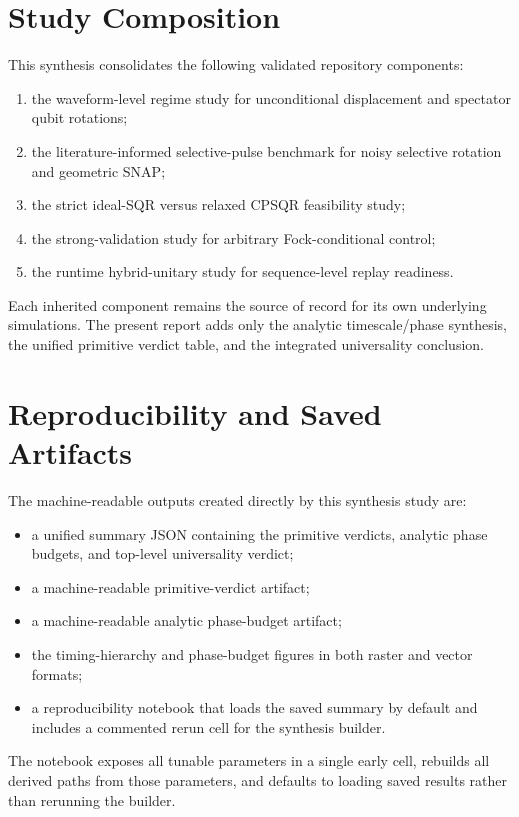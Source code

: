 \documentclass[11pt]{article}
\begin{document}
\appendix

\section{Study Composition}

This synthesis consolidates the following validated repository components:
\begin{enumerate}
\item the waveform-level regime study for unconditional displacement and spectator qubit rotations;
\item the literature-informed selective-pulse benchmark for noisy selective rotation and geometric SNAP;
\item the strict ideal-SQR versus relaxed CPSQR feasibility study;
\item the strong-validation study for arbitrary Fock-conditional control;
\item the runtime hybrid-unitary study for sequence-level replay readiness.
\end{enumerate}

Each inherited component remains the source of record for its own underlying simulations. The present report adds only the analytic timescale/phase synthesis, the unified primitive verdict table, and the integrated universality conclusion.

\section{Reproducibility and Saved Artifacts}

The machine-readable outputs created directly by this synthesis study are:
\begin{itemize}
\item a unified summary JSON containing the primitive verdicts, analytic phase budgets, and top-level universality verdict;
\item a machine-readable primitive-verdict artifact;
\item a machine-readable analytic phase-budget artifact;
\item the timing-hierarchy and phase-budget figures in both raster and vector formats;
\item a reproducibility notebook that loads the saved summary by default and includes a commented rerun cell for the synthesis builder.
\end{itemize}

The notebook exposes all tunable parameters in a single early cell, rebuilds all derived paths from those parameters, and defaults to loading saved results rather than rerunning the builder.



\end{document}

